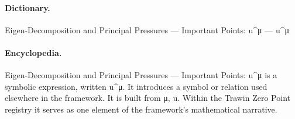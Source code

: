 \paragraph{Dictionary.}
Eigen-Decomposition and Principal Pressures — Important Points: u\textasciicircum{}μ — u\textasciicircum{}μ

\paragraph{Encyclopedia.}
Eigen-Decomposition and Principal Pressures — Important Points: u\textasciicircum{}μ is a symbolic expression, written u\textasciicircum{}μ. It introduces a symbol or relation used elsewhere in the framework. It is built from μ, u. Within the Trawin Zero Point registry it serves as one element of the framework's mathematical narrative.
